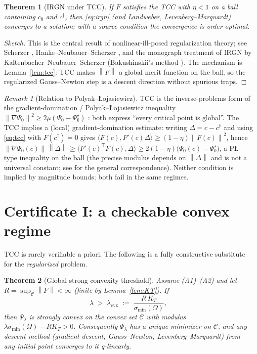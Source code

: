 \documentclass[11pt]{article}
\theoremstyle{plain}
\newtheorem{theorem}{Theorem}[section]
\theoremstyle{definition}
\theoremstyle{remark}
\newtheorem*{remark}{Remark}
\newcommand{\norm}[1]{\left\lVert#1\right\rVert}
\newcommand{\trc}{\mathsf{T}}
\begin{document}
\begin{theorem}[IRGN under TCC]\label{thm:irgn}
If $F$ satisfies the TCC with $\eta<1$ on a ball containing $c_0$ and
$c^\dagger$, then \eqref{eq:irgn} (and Landweber, Levenberg--Marquardt)
converges to a solution; with a source condition the convergence is
order-optimal.
\end{theorem}
\begin{proof}[Sketch]
This is the central result of nonlinear-ill-posed regularization theory;
see Scherzer \cite{scherzer1995}, Hanke--Neubauer--Scherzer
\cite{hanke1995}, and the monograph treatment of IRGN by
Kaltenbacher--Neubauer--Scherzer \cite{kaltenbacher2008}
(Bakushinskii's method \cite{bakushinskii1992}). The mechanism is
Lemma~\ref{lem:tcc}: TCC makes $\norm{F}$ a global merit function on the
ball, so the regularized Gauss--Newton step is a descent direction
without spurious traps.
\end{proof}

\begin{remark}[Relation to Polyak--{\L}ojasiewicz]
TCC is the inverse-problems form of the gradient-domination /
Polyak--{\L}ojasiewicz inequality
$\norm{\nabla\Psi_0}^{2}\ge2\mu(\Psi_0-\Psi_0^\star)$
\cite{polyak1963,lojasiewicz1963,karimi2016}: both express ``every
critical point is global''. The TCC implies a (local) gradient-domination
estimate: writing $\Delta=c-c^\dagger$ and using \eqref{eq:tcc} with
$F(c^\dagger)=0$ gives $\langle F(c),F'(c)\Delta\rangle\ge(1-\eta)
\norm{F(c)}^{2}$, hence
$\norm{\nabla\Psi_0(c)}\,\norm{\Delta}\ge\langle F'(c)^{\trc}F(c),
\Delta\rangle\ge 2(1-\eta)\big(\Psi_0(c)-\Psi_0^\star\big)$,
a P{\L}-type inequality on the ball (the precise modulus depends on
$\norm\Delta$ and is not a universal constant; see
\cite{karimi2016} for the general correspondence). Neither condition is
implied by magnitude bounds; both fail in the same regimes.
\end{remark}

\section{Certificate I: a checkable convex regime}\label{sec:convex}

TCC is rarely verifiable a priori. The following is a fully constructive
substitute for the \emph{regularized} problem.

\begin{theorem}[Global strong convexity threshold]\label{thm:convex}
Assume \textup{(A1)}--\textup{(A2)} and let $R=\sup_{\mathcal
C}\norm{F}<\infty$ (finite by Lemma~\ref{lem:KT}). If
\begin{equation}
\lambda\;>\;\lambda_{\mathrm{cvx}}\;:=\;\frac{R\,K_T}{\sigma_{\min}(\Omega)},
\label{eq:lamcvx}
\end{equation}
then $\Psi_\lambda$ is strongly convex on the convex set $\mathcal C$
with modulus $\lambda\sigma_{\min}(\Omega)-RK_T>0$. Consequently
$\Psi_\lambda$ has a \emph{unique} minimizer on $\mathcal C$, and any
descent method (gradient descent, Gauss--Newton, Levenberg--Marquardt)
from \emph{any} initial point converges to it q-linearly.
\end{theorem}
\end{document}

